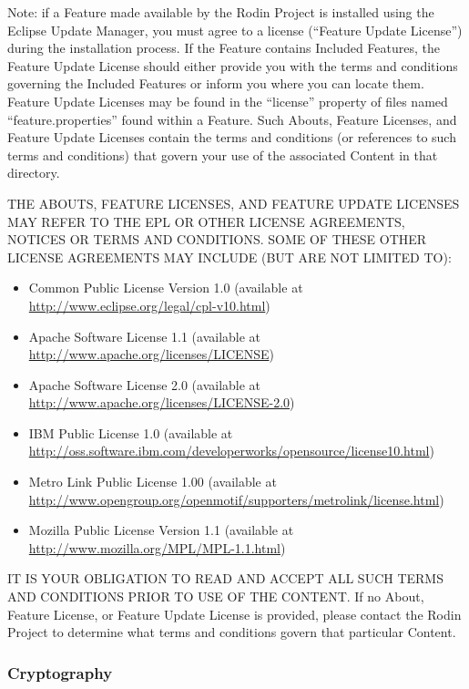 Note: if a Feature made available by the Rodin Project is installed using the Eclipse Update Manager, you must agree to a license (``Feature Update License'') during the installation process. If the Feature contains Included Features, the Feature Update License should either provide you with the terms and conditions governing the Included Features or inform you where you can locate them. Feature Update Licenses may be found in the ``license'' property of files named ``feature.properties'' found within a Feature. Such Abouts, Feature Licenses, and Feature Update Licenses contain the terms and conditions (or references to such terms and conditions) that govern your use of the associated Content in that directory.

THE ABOUTS, FEATURE LICENSES, AND FEATURE UPDATE LICENSES MAY REFER TO THE EPL OR OTHER LICENSE AGREEMENTS, NOTICES OR TERMS AND CONDITIONS. SOME OF THESE OTHER LICENSE AGREEMENTS MAY INCLUDE (BUT ARE NOT LIMITED TO):
\begin{itemize}
\item Common Public License Version 1.0 (available at \url{http://www.eclipse.org/legal/cpl-v10.html})

\item Apache Software License 1.1 (available at \url{http://www.apache.org/licenses/LICENSE})

\item Apache Software License 2.0 (available at \url{http://www.apache.org/licenses/LICENSE-2.0})

\item IBM Public License 1.0 (available at \url{http://oss.software.ibm.com/developerworks/opensource/license10.html})

\item Metro Link Public License 1.00 (available at \url{http://www.opengroup.org/openmotif/supporters/metrolink/license.html})

\item Mozilla Public License Version 1.1 (available at \url{http://www.mozilla.org/MPL/MPL-1.1.html})
\end{itemize}

IT IS YOUR OBLIGATION TO READ AND ACCEPT ALL SUCH TERMS AND CONDITIONS PRIOR TO USE OF THE CONTENT. If no About, Feature License, or Feature Update License is provided, please contact the Rodin Project to determine what terms and conditions govern that particular Content.

\subsubsection{Cryptography}
\label{sec:cryptography}

